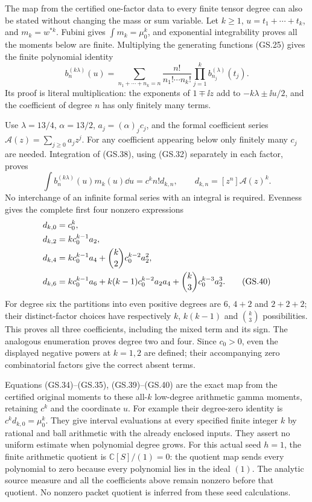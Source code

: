 The map from the certified one-factor data to every finite tensor
degree can also be stated without changing the mass or sum variable.
Let $k\ge1$, $u=t_1+\cdots+t_k$, and $m_k=w^{*k}$. Fubini
gives $\int m_k=\mu_0^k$, and exponential integrability proves
all the moments below are finite. Multiplying the generating
functions (GS.25) gives the finite polynomial identity
\begin{equation}
 b_n^{(k\lambda)}(u)=
 \sum_{n_1+\cdots+n_k=n}\frac{n!}{n_1!\cdots n_k!}
                     \prod_{j=1}^k b_{n_j}^{(\lambda)}(t_j).
 \tag{GS.38}
\end{equation}
Its proof is literal multiplication: the exponents of $1\mp\ii z$
add to $-k\lambda\pm\ii u/2$, and the coefficient of degree
$n$ has only finitely many terms.

Use $\lambda=13/4$, $\alpha=13/2$, $a_j=(\alpha)_j c_j$, and
the formal coefficient series $\mathcal A(z)=\sum_{j\ge0}a_jz^j$.
For any coefficient appearing below only finitely many $c_j$ are
needed. Integration of (GS.38), using (GS.32) separately in each
factor, proves
\begin{equation}
 \int b_n^{(k\lambda)}(u)m_k(u)\dd u
 =c^k n!d_{k,n},\qquad d_{k,n}=[z^n]\mathcal A(z)^k.
 \tag{GS.39}
\end{equation}
No interchange of an infinite formal series with an integral is
required. Evenness gives the complete first four nonzero expressions
\begin{align}
 d_{k,0}&=c_0^k,\notag\\
 d_{k,2}&=k c_0^{k-1}a_2,\notag\\
 d_{k,4}&=k c_0^{k-1}a_4+\binom{k}{2}c_0^{k-2}a_2^2,\notag\\
 d_{k,6}&=k c_0^{k-1}a_6+k(k-1)c_0^{k-2}a_2a_4
                  +\binom{k}{3}c_0^{k-3}a_2^3.
 \tag{GS.40}
\end{align}
For degree six the partitions into even positive degrees are
$6$, $4+2$ and $2+2+2$; their distinct-factor choices have respectively
$k$, $k(k-1)$ and $\binom{k}{3}$ possibilities. This proves all
three coefficients, including the mixed term and its sign.
The analogous enumeration proves degree two and four. Since
$c_0>0$, even the displayed negative powers at $k=1,2$ are defined;
their accompanying zero combinatorial factors give the correct
absent terms.

Equations (GS.34)--(GS.35), (GS.39)--(GS.40) are the exact map
from the certified original moments to these all-$k$ low-degree
arithmetic gamma moments, retaining $c^k$ and the coordinate $u$.
For example their degree-zero identity is $c^k d_{k,0}=\mu_0^k$.
They give interval evaluations at every specified finite integer $k$
by rational and ball arithmetic with the already enclosed inputs.
They assert no uniform estimate when polynomial degree grows.
For this actual seed $h=1$, the finite arithmetic quotient is
$\mathbb C[S]/(1)=0$: the quotient map sends every polynomial to
zero because every polynomial lies in the ideal $(1)$. The analytic
source measure and all the coefficients above remain nonzero before
that quotient. No nonzero packet quotient is inferred from these
seed calculations.

\endgroup
